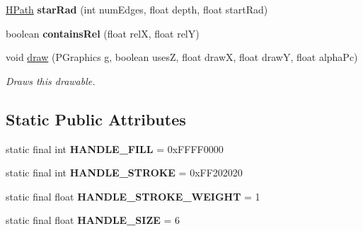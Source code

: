 \begin{DoxyCompactItemize}
\item 
\hypertarget{classhype_1_1extended_1_1drawable_1_1_h_path_a31b900ceb515728436ebe504ebbbeda1}{\hyperlink{classhype_1_1extended_1_1drawable_1_1_h_path}{H\-Path} {\bfseries star\-Rad} (int num\-Edges, float depth, float start\-Rad)}\label{classhype_1_1extended_1_1drawable_1_1_h_path_a31b900ceb515728436ebe504ebbbeda1}

\item 
\hypertarget{classhype_1_1extended_1_1drawable_1_1_h_path_ac8f128faad7c12a1a9b0878b9ce503d6}{boolean {\bfseries contains\-Rel} (float rel\-X, float rel\-Y)}\label{classhype_1_1extended_1_1drawable_1_1_h_path_ac8f128faad7c12a1a9b0878b9ce503d6}

\item 
void \hyperlink{classhype_1_1extended_1_1drawable_1_1_h_path_ad373de270293557c0e2ea5eb54903b3e}{draw} (P\-Graphics g, boolean uses\-Z, float draw\-X, float draw\-Y, float alpha\-Pc)
\begin{DoxyCompactList}\small\item\em Draws this drawable. \end{DoxyCompactList}\end{DoxyCompactItemize}
\subsection*{Static Public Attributes}
\begin{DoxyCompactItemize}
\item 
\hypertarget{classhype_1_1extended_1_1drawable_1_1_h_path_acc639d9a868f1b2aee55fbedcb05ec71}{static final int {\bfseries H\-A\-N\-D\-L\-E\-\_\-\-F\-I\-L\-L} = 0x\-F\-F\-F\-F0000}\label{classhype_1_1extended_1_1drawable_1_1_h_path_acc639d9a868f1b2aee55fbedcb05ec71}

\item 
\hypertarget{classhype_1_1extended_1_1drawable_1_1_h_path_ac53a76846e735001afe403cacbf1b336}{static final int {\bfseries H\-A\-N\-D\-L\-E\-\_\-\-S\-T\-R\-O\-K\-E} = 0x\-F\-F202020}\label{classhype_1_1extended_1_1drawable_1_1_h_path_ac53a76846e735001afe403cacbf1b336}

\item 
\hypertarget{classhype_1_1extended_1_1drawable_1_1_h_path_a26d814cad78d489ee4f910bbfaa6b673}{static final float {\bfseries H\-A\-N\-D\-L\-E\-\_\-\-S\-T\-R\-O\-K\-E\-\_\-\-W\-E\-I\-G\-H\-T} = 1}\label{classhype_1_1extended_1_1drawable_1_1_h_path_a26d814cad78d489ee4f910bbfaa6b673}

\item 
\hypertarget{classhype_1_1extended_1_1drawable_1_1_h_path_a40108f70fe1b4f70d2bcd98513d55f43}{static final float {\bfseries H\-A\-N\-D\-L\-E\-\_\-\-S\-I\-Z\-E} = 6}\label{classhype_1_1extended_1_1drawable_1_1_h_path_a40108f70fe1b4f70d2bcd98513d55f43}

\end{DoxyCompactItemize}
